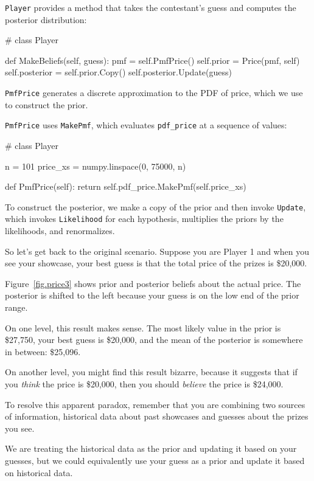 \documentclass[12pt]{book}
\theoremstyle{exercise}
\begin{document}
{\tt Player} provides a method that takes the contestant's
guess and computes the posterior distribution:

\begin{code}
# class Player

    def MakeBeliefs(self, guess):
        pmf = self.PmfPrice()
        self.prior = Price(pmf, self)
        self.posterior = self.prior.Copy()
        self.posterior.Update(guess)
\end{code}

{\tt PmfPrice} generates a discrete approximation
to the PDF of price, which we use to construct the prior.

{\tt PmfPrice} uses {\tt MakePmf}, which
evaluates \verb"pdf_price" at a sequence of values:

\begin{code}
# class Player

    n = 101
    price_xs = numpy.linspace(0, 75000, n)

    def PmfPrice(self):
        return self.pdf_price.MakePmf(self.price_xs)
\end{code}

To construct the posterior, we make a copy of the
prior and then invoke {\tt Update}, which invokes {\tt Likelihood}
for each hypothesis, multiplies the priors by the likelihoods,
and  renormalizes.

So let's get back to the original scenario.  Suppose you are
Player 1 and when you see your showcase, your best guess is
that the total price of the prizes is \$20,000.

Figure~\ref{fig.price3} shows prior and
posterior beliefs about the actual price.
The posterior is shifted
to the left because your guess 
is on the low end of the prior range.

On one level, this result makes sense.  The most likely value
in the prior is \$27,750, your best guess is \$20,000, and
the mean of the posterior is somewhere in between: \$25,096.

On another level, you might find this result bizarre, because it
suggests that if you {\em think} the price is \$20,000, then you
should {\em believe} the price is \$24,000.

To resolve this apparent paradox, remember that you are combining two
sources of information, historical data about past showcases and
guesses about the prizes you see.

We are treating the historical data as the prior and updating it
based on your guesses, but we could equivalently use your guess
as a prior and update it based on historical data.  
\end{document}
